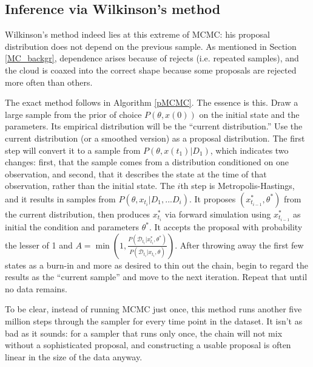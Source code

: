 \documentclass{article}
\begin{document}
\subsection{Inference via Wilkinson's method}
Wilkinson's method indeed lies at this extreme of MCMC: his proposal distribution does not depend on the previous sample. As mentioned in Section \ref{MC_backgr}, dependence arises because of rejects (i.e. repeated samples), and the cloud is coaxed into the correct shape because some proposals are rejected more often than others. 

The exact method follows in Algorithm \ref{pMCMC}. The essence is this. Draw a large sample from the prior of choice $P(\theta, x(0))$ on the initial state and the parameters. Its empirical distribution will be the ``current distribution.'' Use the current distribution (or a smoothed version) as a proposal distribution. The first step will convert it to a sample from $P(\theta, x(t_1)|D_1)$, which indicates two changes: first, that the sample comes from a distribution conditioned on one observation, and second, that it describes the state at the time of that observation, rather than the initial state. The $i$th step is Metropolis-Hastings, and it results in samples from $P(\theta, x_{t_i}|D_{1}, ...D_{i})$. It proposes $(x_{t_{i-1}}^*, \theta^*)$ from the current distribution, then produces $x_{t_{i}}^*$ via forward simulation using $x_{t_{i-1}}^*$ as initial the condition and parameters $\theta^*$. It accepts the proposal with probability the lesser of 1 and $A=\min(1, \frac{P(\mathcal{D}_{t_{i}}|x_{t_{i}}^*, \theta^*)}{P(\mathcal{D}_{t_{i}}|x_{t_{i}}, \theta)})$. After throwing away the first few states as a burn-in and more as desired to thin out the chain, begin to regard the results as the ``current sample'' and move to the next iteration. Repeat that until no data remains.

To be clear, instead of running MCMC just once, this method runs another five million steps through the sampler for every time point in the dataset. It isn’t as bad as it sounds: for a sampler that runs only once, the chain will not mix without a sophisticated proposal, and constructing a usable proposal is often linear in the size of the data anyway.
\end{document}

